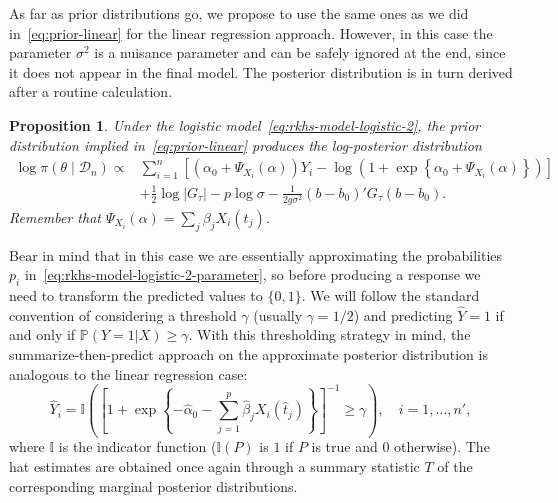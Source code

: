 \documentclass[ba]{imsart}
\numberwithin{equation}{section}
\theoremstyle{plain}
\newtheorem{proposition}{Proposition}[section]
\begin{document}
As far as prior distributions go, we propose to use the same ones as we did in~\eqref{eq:prior-linear} for the linear regression approach. However, in this case the parameter \(\sigma^2\) is a nuisance parameter and can be safely ignored at the end, since it does not appear in the final model. The posterior distribution is in turn derived after a routine calculation.

\begin{proposition}
Under the logistic model~\eqref{eq:rkhs-model-logistic-2}, the prior distribution implied in~\eqref{eq:prior-linear} produces the log-posterior distribution
\begin{align*}
  \log \pi(\theta \mid \mathcal D_n) \propto {} & \sum_{i=1}^n \left[ \left(\alpha_0 + \Psi_{X_i}(\alpha)\right)Y_i - \log\left(1 + \exp\left\{\alpha_0 + \Psi_{X_i}(\alpha)\right\}\right)\right]\\
  \quad &+ \frac{1}{2}\log |G_\tau| - p\log \sigma -\frac{1}{2g\sigma^2} (b - b_0)'G_\tau(b - b_0).
\end{align*}
Remember that \(\Psi_{X_i}(\alpha) = \sum_j \beta_j X_i(t_j)\).
\end{proposition}

Bear in mind that in this case we are essentially approximating the probabilities \(p_i\) in~\eqref{eq:rkhs-model-logistic-2-parameter}, so before producing a response we need to transform the predicted values to \(\{0, 1\}\). We will follow the standard convention of considering a threshold \(\gamma\) (usually \(\gamma = 1/2\)) and predicting \(\hat Y=1\) if and only if \(\mathbb P(Y=1|X) \geq \gamma\). With this thresholding strategy in mind, the summarize-then-predict approach on the approximate posterior distribution is analogous to the linear regression case:
\[
\hat Y_i = \mathbb I \left( \left[\displaystyle 1 + \exp\left\{-\hat\alpha_0 - \sum_{j=1}^p \hat\beta_j X_i(\hat t_j)\right\}\right]^{-1} \geq \gamma \right), \quad i=1,\dots,n',
\]
where \(\mathbb I\) is the indicator function (\(\mathbb I(P)\) is \(1\) if \(P\) is true and \(0\) otherwise). The hat estimates are obtained once again through a summary statistic \(T\) of the corresponding marginal posterior distributions.
\end{document}
